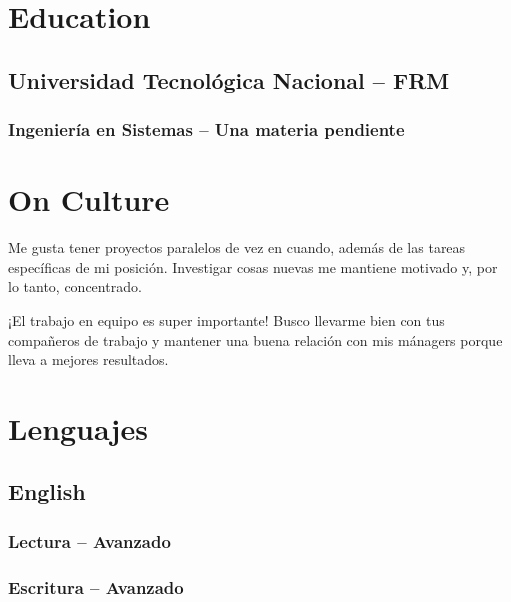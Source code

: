 \documentclass{article}
\begin{document}
\section{Education}
\subsection{Universidad Tecnológica Nacional – FRM}
\subsubsection{Ingeniería en Sistemas – Una materia pendiente}
\section{On Culture}
  \begin{description}
    \item Me gusta tener proyectos paralelos de vez en cuando, además de las tareas específicas de mi posición. Investigar cosas nuevas me mantiene motivado y, por lo tanto, concentrado.
    \item ¡El trabajo en equipo es super importante! Busco llevarme bien con tus compañeros de trabajo y mantener una buena relación con mis mánagers porque lleva a mejores resultados.
  \end{description}
\section{Lenguajes}
\subsection{English}
\subsubsection{Lectura – Avanzado}
\subsubsection{Escritura – Avanzado}
\end{document}
